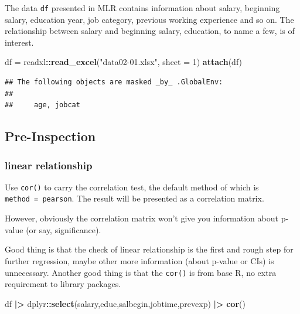 \documentclass[
]{ctexart}
\newenvironment{Shaded}{\begin{snugshade}}{\end{snugshade}}
\newcommand{\AttributeTok}[1]{\textcolor[rgb]{0.13,0.29,0.53}{#1}}
\newcommand{\DecValTok}[1]{\textcolor[rgb]{0.00,0.00,0.81}{#1}}
\newcommand{\FunctionTok}[1]{\textcolor[rgb]{0.13,0.29,0.53}{\textbf{#1}}}
\newcommand{\NormalTok}[1]{#1}
\newcommand{\OtherTok}[1]{\textcolor[rgb]{0.56,0.35,0.01}{#1}}
\newcommand{\SpecialCharTok}[1]{\textcolor[rgb]{0.81,0.36,0.00}{\textbf{#1}}}
\newcommand{\StringTok}[1]{\textcolor[rgb]{0.31,0.60,0.02}{#1}}
\begin{document}
The data \texttt{df} presented in MLR contains information about salary,
beginning salary, education year, job category, previous working
experience and so on. The relationship between salary and beginning
salary, education, to name a few, is of interest.

\begin{Shaded}
\begin{Highlighting}[]
\NormalTok{df }\OtherTok{=}\NormalTok{ readxl}\SpecialCharTok{::}\FunctionTok{read\_excel}\NormalTok{(}\StringTok{"data02{-}01.xlsx"}\NormalTok{, }\AttributeTok{sheet =} \DecValTok{1}\NormalTok{)}
\FunctionTok{attach}\NormalTok{(df)}
\end{Highlighting}
\end{Shaded}

\begin{verbatim}
## The following objects are masked _by_ .GlobalEnv:
## 
##     age, jobcat
\end{verbatim}

\hypertarget{pre-inspection-1}{%
\subsection{Pre-Inspection}\label{pre-inspection-1}}

\hypertarget{linear-relationship}{%
\subsubsection{linear relationship}\label{linear-relationship}}

Use \texttt{cor()} to carry the correlation test, the default method of
which is
\texttt{method\ =\ \textquotesingle{}pearson\textquotesingle{}}. The
result will be presented as a correlation matrix.

However, obviously the correlation matrix won't give you information
about p-value (or say, significance).

Good thing is that the check of linear relationship is the first and
rough step for further regression, maybe other more information (about
p-value or CIs) is unnecessary. Another good thing is that the
\texttt{cor()} is from base R, no extra requirement to library packages.

\begin{Shaded}
\begin{Highlighting}[]
\NormalTok{df }\SpecialCharTok{|\textgreater{}}\NormalTok{ dplyr}\SpecialCharTok{::}\FunctionTok{select}\NormalTok{(salary,educ,salbegin,jobtime,prevexp) }\SpecialCharTok{|\textgreater{}} \FunctionTok{cor}\NormalTok{()}
\end{Highlighting}
\end{Shaded}
\end{document}
